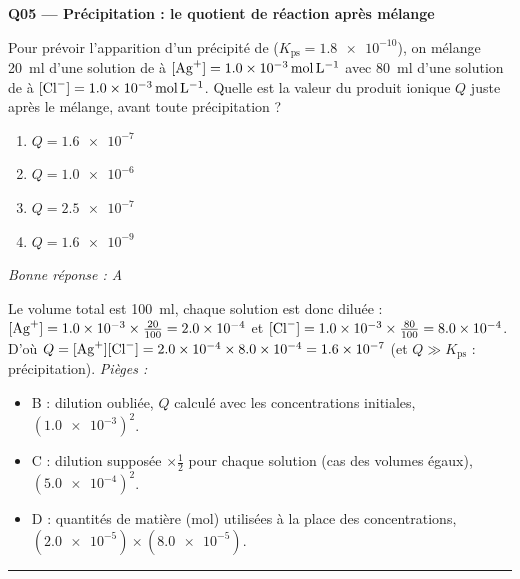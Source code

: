 \documentclass[11pt,a4paper]{article}
\begin{document}
\noindent\textbf{Q05 --- Précipitation : le quotient de réaction après mélange}\par
Pour prévoir l'apparition d'un précipité de  ($K_{\mathrm{ps}} = \num{1.8e-10}$), on mélange
\qty{20}{\milli\litre} d'une solution de  à $[\ce{Ag+}] = \qty{1.0e-3}{\mole\per\litre}$ avec
\qty{80}{\milli\litre} d'une solution de  à $[\ce{Cl-}] = \qty{1.0e-3}{\mole\per\litre}$.
Quelle est la valeur du produit ionique $Q$ juste après le mélange, avant toute précipitation ?
\begin{enumerate}[label=\Alph*)]
\item $Q = \num{1.6e-7}$
\item $Q = \num{1.0e-6}$
\item $Q = \num{2.5e-7}$
\item $Q = \num{1.6e-9}$
\end{enumerate}
\textit{Bonne réponse : A}\par
Le volume total est \qty{100}{\milli\litre}, chaque solution est donc diluée : $[\ce{Ag+}] = \num{1.0e-3}\times\frac{20}{100} = \num{2.0e-4}$
et $[\ce{Cl-}] = \num{1.0e-3}\times\frac{80}{100} = \num{8.0e-4}$. D'où
$Q = [\ce{Ag+}][\ce{Cl-}] = \num{2.0e-4}\times\num{8.0e-4} = \num{1.6e-7}$ (et $Q \gg K_{\mathrm{ps}}$ : précipitation).
\textit{Pièges :}
\begin{itemize}
\item B : dilution oubliée, $Q$ calculé avec les concentrations initiales, $(\num{1.0e-3})^{2}$.
\item C : dilution supposée $\times\tfrac{1}{2}$ pour chaque solution (cas des volumes égaux), $(\num{5.0e-4})^{2}$.
\item D : quantités de matière (mol) utilisées à la place des concentrations, $(\num{2.0e-5})\times(\num{8.0e-5})$.
\end{itemize}
\vspace{6pt}\hrule\vspace{8pt}
\end{document}
